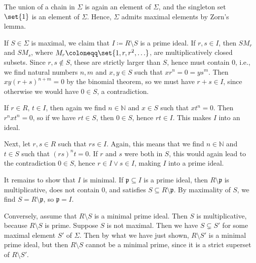 The union of a chain in $\Sigma$ is again an element of $\Sigma$, and the singleton
set  $\set{1}$ is an element of $\Sigma$. Hence, $\Sigma$ admits maximal elements
by Zorn's lemma.

If $S \in \Sigma$ is maximal, we claim that $I\coloneqq R\setminus S$ is a prime
ideal. If $r, s \in I$,
then $SM_r$ and $SM_s$, where $M_r\coloneqq \set{1, r, r^2, \ldots}$,
are multiplicatively closed subsets. Since  $r, s \notin S$, these are strictly
larger than $S$, hence must contain $0$, i.e., we find natural numbers
$n, m$ and $x, y \in S$ such that $xr^n = 0 = ys^m$. Then $xy(r+s)^{n+m} = 0$
by the binomial theorem, so we must have $r + s \in I$, since otherwise
we would have $0 \in S$, a contradiction.

If $r \in R$, $t \in I$, then again we find $n \in \mathbb{N}$ and $x \in S$ such
that $xt^n = 0$. Then $r^nxt^n = 0$, so if we have $rt \in S$, then $0 \in S$,
hence $rt \in I$. This makes $I$ into an ideal.

Next, let $r, s \in R$ such that $rs \in I$. Again, this means that we find $n \in \mathbb{N}$
and $t \in S$ such that $(rs)^nt = 0$. If $r$ and $s$ were both in $S$, this would again
lead to the contradiction $0 \in S$, hence $r \in I \vee s \in I$, making $I$ into
a prime ideal.

It remains to show that $I$ is minimal. If $\mathfrak{p} \subseteq I$ is a prime ideal,
then $R \setminus \mathfrak{p}$ is multiplicative, does not contain $0$, and
satisfies $S \subseteq R\setminus \mathfrak{p}$. By maximality of $S$, we find
$S = R\setminus \mathfrak{p}$, so $\mathfrak{p} = I$.

Conversely, assume that $R\setminus S$ is a minimal prime ideal. Then $S$ is
multiplicative, because $R\setminus S$ is prime. Suppose $S$ is not maximal.
Then we have $S \subsetneq S'$ for some maximal element $S'$ of $\Sigma$. Then
by what we have just shown,
$R\setminus S'$ is a minimal prime ideal, but then $R\setminus S$ cannot be a
minimal prime, since it is a strict superset of $R\setminus S'$.

